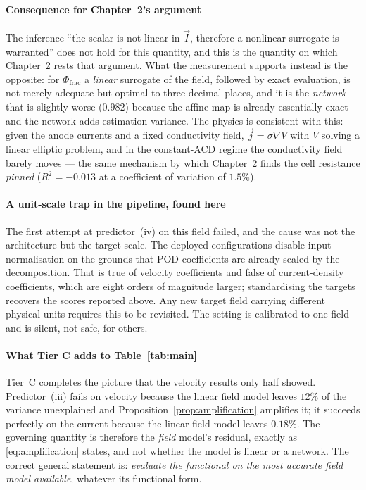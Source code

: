 \documentclass[11pt,a4paper]{article}
\theoremstyle{plain}
\theoremstyle{definition}
\theoremstyle{remark}
\begin{document}
\paragraph{Consequence for Chapter~2's argument}
The inference ``the scalar is not linear in $\vec{I}$, therefore a nonlinear
surrogate is warranted'' does not hold for this quantity, and this is the
quantity on which Chapter~2 rests that argument. What the measurement supports
instead is the opposite: for $\Phi_{\mathrm{frac}}$ a \emph{linear} surrogate of
the field, followed by exact evaluation, is not merely adequate but optimal to
three decimal places, and it is the \emph{network} that is slightly worse
($0.982$) because the affine map is already essentially exact and the network
adds estimation variance. The physics is consistent with this: given the anode
currents and a fixed conductivity field, $\vec{j} = \sigma\nabla V$ with $V$
solving a linear elliptic problem, and in the constant-ACD regime the
conductivity field barely moves --- the same mechanism by which Chapter~2 finds
the cell resistance \emph{pinned} ($R^2 = -0.013$ at a coefficient of variation
of $1.5\%$).

\label{rem:normalise}
\paragraph{A unit-scale trap in the pipeline, found here}
The first attempt at predictor~(iv) on this field failed, and the cause was not
the architecture but the target scale. The deployed configurations disable input
normalisation on the grounds that POD coefficients are already scaled by the
decomposition. That is true of velocity coefficients and false of
current-density coefficients, which are eight orders of magnitude larger;
standardising the targets recovers the scores reported above. Any new target
field carrying different physical units requires this to be revisited. The
setting is calibrated to one field and is silent, not safe, for others.

\paragraph{What Tier C adds to Table~\ref{tab:main}}
Tier~C completes the picture that the velocity results only half showed.
Predictor~(iii) fails on velocity because the linear field model leaves $12\%$
of the variance unexplained and
Proposition~\ref{prop:amplification} amplifies it; it succeeds perfectly on the
current because the linear field model leaves $0.18\%$. The governing quantity
is therefore the \emph{field} model's residual, exactly as
\eqref{eq:amplification} states, and not whether the model is linear or a
network. The correct general statement is: \emph{evaluate the functional on the
most accurate field model available}, whatever its functional form.
\end{document}
